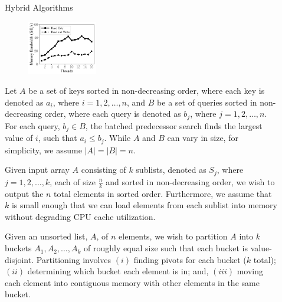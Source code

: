 \documentclass[final]{beamer}
\newlength{\sepwidth}
\newlength{\colwidth}
\newcommand{\separatorcolumn}{\begin{column}{\sepwidth}\end{column}}
\begin{document}
\begin{frame}[t]
\begin{columns}[t]
\begin{column}{\colwidth}
\begin{block}{Hybrid Algorithms}
\begin{figure}[htp]
\centering
    \includegraphics[height=0.2\textwidth, width=0.30\textwidth, trim={0.5cm 0.5cm 0.5cm 1cm}]{figures/microbenchmarks_time_vs_threads.pdf}	
   \label{fig:mem_bandwidth_scalability}
\end{figure}


   Let $A$ be a set of keys sorted in non-decreasing order,  
   where each key is denoted as $a_i$, where $i=1, 2,\ldots,n$, and $B$ be a set of queries sorted in non-decreasing order, 
   where each query is denoted as $b_j$, where $j=1, 2,\ldots,n$. For each query, $b_j\in B$, the batched predecessor search 
   finds the largest value of $i$, such that $a_i\leq b_j$. While $A$ and $B$ can vary in size, for simplicity, we assume $|A|=|B|=n$.


   Given input array $A$ consisting of $k$ sublists, denoted as $S_j$, 
   where $j=1, 2,\ldots,k$, each of size  $\frac{n}{k}$ and sorted in non-decreasing order, we wish to output the $n$ total elements 
   in sorted order. Furthermore, we assume that $k$ is small enough that we can load elements 
   from each sublist into memory without degrading CPU cache utilization.


Given an unsorted list, $A$, of $n$ elements, we wish to partition $A$ into $k$ buckets $A_1, A_2, \ldots, A_k$ of roughly equal size such that each bucket is value-disjoint. Partitioning involves $(i)$ finding pivots for each bucket ($k$ total); $(ii)$ determining which bucket each element is in; and, $(iii)$ moving each element into contiguous memory with other elements in the same bucket.  

  \end{block}

\end{column}

\separatorcolumn

\begin{column}{\colwidth}


\end{column}
\end{columns}
\end{frame}
\end{document}
